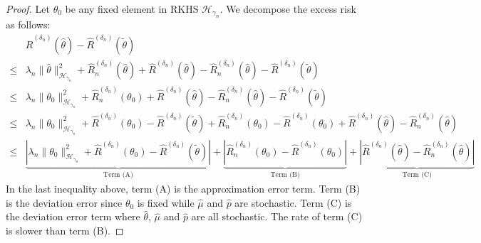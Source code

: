 \begin{proof}

Let $\theta_0$ be any fixed element in RKHS $\mathcal{H}_{\gamma_n}$. We decompose the excess risk as follows:
    \begin{align*}
   &\widehat R^{({\delta_n})}(\widehat\theta) - \widehat R^{({\delta_n})}(\tilde\theta)\\
   \leq & \lambda_n\|\widehat\theta\|^2_{\mathcal{H}_{\gamma_n}}+ \widehat R_n^{({\delta_n})}(\widehat\theta)+\widehat R^{({\delta_n})}(\widehat\theta)  - \widehat R_n^{({\delta_n})}(\widehat\theta) - \widehat R^{({\delta_n})}(\tilde\theta)\\
   \leq & \lambda_n\|\theta_0\|^2_{\mathcal{H}_{\gamma_n}}  + \widehat R_n^{({\delta_n})}(\theta_0)+ \widehat R^{({\delta_n})}(\widehat\theta) - \widehat R_n^{({\delta_n})}(\widehat\theta) - \widehat R^{({\delta_n})}(\tilde\theta)\\
   \leq & \lambda_n\|\theta_0\|^2_{\mathcal{H}_{\gamma_n}}+\widehat R^{({\delta_n})}(\theta_0) -\widehat R^{({\delta_n})}(\tilde\theta) + \widehat R_n^{({\delta_n})}(\theta_0) - \widehat R^{({\delta_n})}(\theta_0) +
   \widehat R^{({\delta_n})}(\widehat\theta)
     -\widehat R_n^{({\delta_n})}(\widehat\theta) \\
   \leq & \underbrace{\left|\lambda_n\|\theta_0\|^2_{\mathcal{H}_{\gamma_n}}+\widehat R^{({\delta_n})}(\theta_0) -\widehat R^{({\delta_n})}(\tilde\theta)\right|}_{\text{Term (A)}} + \underbrace{\left|\widehat R_n^{({\delta_n})}(\theta_0) - \widehat R^{({\delta_n})}(\theta_0)\right|}_{\text{Term (B)}} + \underbrace{
   \left|\widehat R^{({\delta_n})}(\widehat\theta)
     -\widehat R_n^{({\delta_n})}(\widehat\theta)\right|}_{\text{Term  (C)}}
\end{align*}
In the last inequality above, term (A) is the approximation error term. Term (B) is the deviation error since $\theta_0$ is fixed while $\widehat \mu$ and $\widehat p$ are stochastic. Term (C) is the deviation error term where  $\widehat\theta$, $\widehat \mu$ and $\widehat p$ are all stochastic. The rate of term (C) is slower than term (B).



\end{proof}
